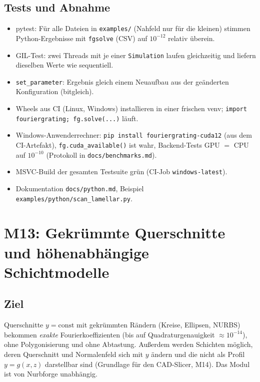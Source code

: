 \subsection{Tests und Abnahme}
\begin{itemize}[nosep]
  \item pytest: Für alle Dateien in \verb|examples/| (Nahfeld nur für die kleinen) stimmen Python-Ergebnisse mit
        \verb|fgsolve| (CSV) auf $10^{-12}$ relativ überein.
  \item GIL-Test: zwei Threads mit je einer \verb|Simulation| laufen gleichzeitig und liefern dieselben Werte wie sequentiell.
  \item \verb|set_parameter|: Ergebnis gleich einem Neuaufbau aus der geänderten Konfiguration (bitgleich).
  \item Wheels aus CI (Linux, Windows) installieren in einer frischen venv; \verb|import fouriergrating; fg.solve(...)| läuft.
  \item Windows-Anwenderrechner: \verb|pip install fouriergrating-cuda12| (aus dem CI-Artefakt), \verb|fg.cuda_available()|
        ist wahr, Backend-Tests GPU $=$ CPU auf $10^{-10}$ (Protokoll in \verb|docs/benchmarks.md|).
  \item MSVC-Build der gesamten Testsuite grün (CI-Job \verb|windows-latest|).
  \item Dokumentation \verb|docs/python.md|, Beispiel \verb|examples/python/scan_lamellar.py|.
\end{itemize}

\section{M13: Gekrümmte Querschnitte und höhenabhängige Schichtmodelle}\label{sec:contour}

\subsection{Ziel}
Querschnitte $y=\text{const}$ mit gekrümmten Rändern (Kreise, Ellipsen, NURBS) bekommen \emph{exakte}
Fourierkoeffizienten (bis auf Quadraturgenauigkeit $\approx10^{-14}$), ohne Polygonisierung und ohne Abtastung.
Außerdem werden Schichten möglich, deren Querschnitt und Normalenfeld sich mit $y$ ändern und die nicht als
Profil $y=g(x,z)$ darstellbar sind (Grundlage für den CAD-Slicer, M14). Das Modul ist von Nurbforge unabhängig.

